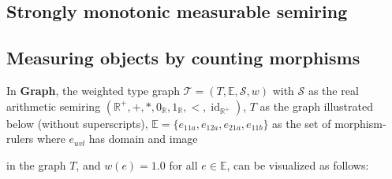 
\subsection{Strongly monotonic measurable semiring}
\label{sec:strongly_monotonic_measurable_semiring}

\subsection{Measuring objects by counting morphisms}
\begin{example}
    \label{example:weighted_type_graph}
     In \textbf{Graph}, the weighted type graph $\mathcal{T} = (T, \mathbb{E}, \mathcal{S}, w)$ with $\mathcal{S}$ as the real arithmetic semiring $(\mathbb{R}^+, +, *, 0_\mathbb{R}, 1_\mathbb{R}, <, \operatorname{id}_{\mathbb{R}^+})$,
     $T$ as the graph illustrated below (without superscripts), $\mathbb{E}=\{e_{11a},e_{12a},e_{21a},e_{11b}\}$ as the set of morphism-rulers where 
     $e_{uvl}$ has domain 
      and image 
     in the graph $T$,
    and $w(e) = 1.0$ for all $e \in \mathbb{E}$, can be visualized as follows:
    \begin{center}
    \end{center}
\end{example}

